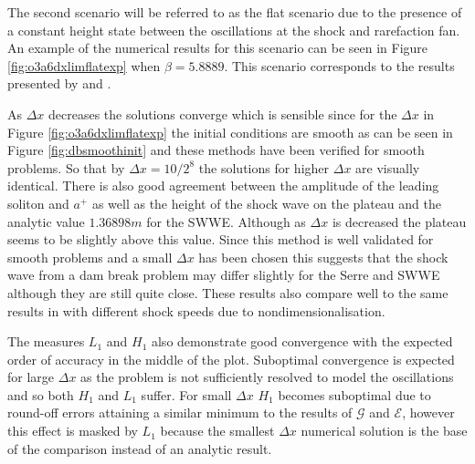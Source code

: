\documentclass[SingleSpace,12pt,Journal]{Serre_ASCE}
\begin{document}
The second scenario will be referred to as the flat scenario due to the presence of a constant height state between the oscillations at the shock and rarefaction fan. An example of the numerical results for this scenario can be seen in Figure \ref{fig:o3a6dxlimflatexp} when $\beta = 5.8889$. This scenario corresponds to the results presented by  and . 

As $\Delta x$ decreases the solutions converge which is sensible since for the $\Delta x$ in Figure \ref{fig:o3a6dxlimflatexp} the initial conditions are smooth as can be seen in Figure \ref{fig:dbsmoothinit} and these methods have been verified for smooth problems. So that by $\Delta x = 10 / 2^8$ the solutions for higher $\Delta x$ are visually identical. There is also good agreement between the amplitude of the leading soliton and $a^+$ as well as the height of the shock wave on the plateau and the analytic value $1.36898 m$ for the SWWE. Although as $\Delta x$ is decreased the plateau seems to be slightly above this value. Since this method is well validated for smooth problems and a small $\Delta x$ has been chosen this suggests that the shock wave from a dam break problem may differ slightly for the Serre and SWWE although they are still quite close. These results also compare well to the same results in  with different shock speeds due to nondimensionalisation. 

The measures $L_1$ and $H_1$ also demonstrate good convergence with the expected order of accuracy in the middle of the plot. Suboptimal convergence is expected for large $\Delta x$ as the problem is not sufficiently resolved to model the oscillations and so both $H_1$ and $L_1$ suffer. For small $\Delta x$ $H_1$ becomes suboptimal due to round-off errors attaining a similar minimum to the results of $\mathcal{G}$ and $\mathcal{E}$, however this effect is masked by $L_1$ because the smallest $\Delta x$ numerical solution is the base of the comparison instead of an analytic result.
\end{document}
